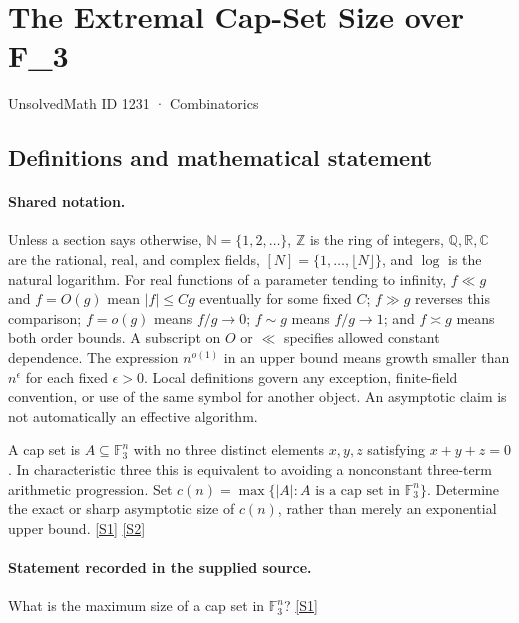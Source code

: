 \documentclass[11pt,a4paper]{article}
\newcommand{\N}{\mathbb{N}}
\newcommand{\Z}{\mathbb{Z}}
\newcommand{\Q}{\mathbb{Q}}
\newcommand{\R}{\mathbb{R}}
\newcommand{\C}{\mathbb{C}}
\newcommand{\F}{\mathbb{F}}
\newcommand{\sref}[2]{\hyperlink{source:#1:#2}{[S#2]}}
\begin{document}

\setcounter{section}{1230}

\section{The Extremal Cap-Set Size over F\_3}\label{1231}

{\small\sffamily UnsolvedMath ID 1231 · Combinatorics}

\subsection{Definitions and mathematical statement}

\paragraph{Shared notation.}Unless a section says otherwise, $\N=\{1,2,\ldots\}$,
$\Z$ is the ring of integers, $\Q,\R,\C$ are the rational, real, and complex
fields, $[N]=\{1,\ldots,\lfloor N\rfloor\}$, and $\log$ is the natural
logarithm. For real functions of a parameter tending to infinity,
$f\ll g$ and $f=O(g)$ mean $|f|\leq Cg$ eventually for some fixed $C$;
$f\gg g$ reverses this comparison; $f=o(g)$ means $f/g\to0$;
$f\sim g$ means $f/g\to1$; and $f\asymp g$ means both order bounds.
A subscript on $O$ or $\ll$ specifies allowed constant dependence.
The expression $n^{o(1)}$ in an upper bound means growth smaller than
$n^\epsilon$ for each fixed $\epsilon>0$. Local definitions govern any
exception, finite-field convention, or use of the same symbol for another
object. An asymptotic claim is not automatically an effective algorithm.



A cap set is $A\subseteq\F_3^n$ with no three distinct elements $x,y,z$ satisfying $x+y+z=0$. In characteristic three this is equivalent to avoiding a nonconstant three-term arithmetic progression. Set $c(n)=\max\{|A|:A\text{ is a cap set in }\F_3^n\}$. Determine the exact or sharp asymptotic size of $c(n)$, rather than merely an exponential upper bound. \sref{1231}{1} \sref{1231}{2}

\paragraph{Statement recorded in the supplied source.}
What is the maximum size of a cap set in $\mathbb{F}_3^n$? \sref{1231}{1}
\end{document}
